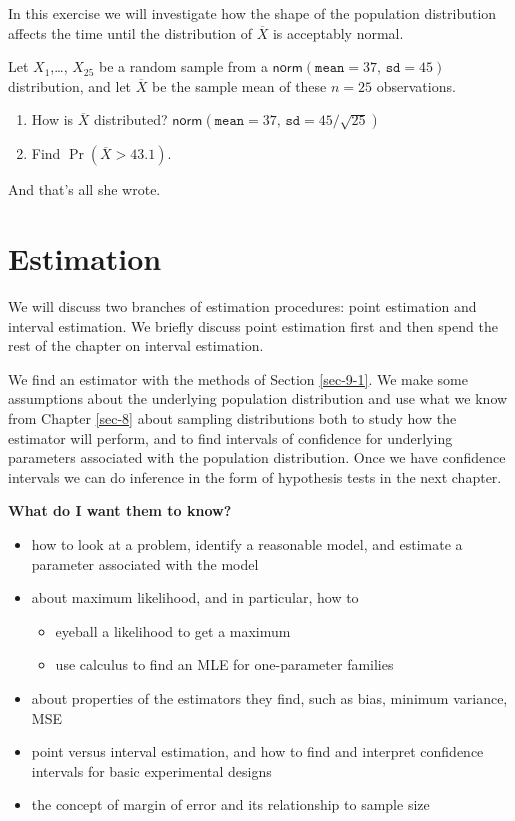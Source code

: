 \documentclass[captions=tableheading]{scrbook}
\begin{document}
\begin{xca}
In this exercise we will investigate how the shape of the population distribution affects the time until the distribution of \(\overline{X}\) is acceptably normal.
\end{xca}

\begin{xca}
Let \(X_{1}\),\ldots{}, \(X_{25}\) be a random sample from a \(\mathsf{norm}(\mathtt{mean}=37,\,\mathtt{sd}=45)\) distribution, and let \(\overline{X}\) be the sample mean of these \(n=25\) observations.
\begin{enumerate}
\item How is \(\overline{X}\) distributed? 
   \(\mathsf{norm}(\mathtt{mean}=37,\,\mathtt{sd}=45/\sqrt{25})\)
\item Find \(\Pr(\overline{X} > 43.1)\).
\end{enumerate}
And that's all she wrote.
\end{xca}
\chapter{Estimation}
\label{sec-9}
\label{cha-Estimation}


\noindent 
We will discuss two branches of estimation procedures: point estimation and interval estimation. We briefly discuss point estimation first and then spend the rest of the chapter on interval estimation.

We find an estimator with the methods of Section \ref{sec-9-1}. We make some assumptions about the underlying population distribution and use what we know from Chapter \ref{sec-8} about sampling distributions both to study how the estimator will perform, and to find intervals of confidence for underlying parameters associated with the population distribution. Once we have confidence intervals we can do inference in the form of hypothesis tests in the next chapter.

\textbf{What do I want them to know?}
\begin{itemize}
\item how to look at a problem, identify a reasonable model, and estimate a parameter associated with the model
\item about maximum likelihood, and in particular, how to
\begin{itemize}
\item eyeball a likelihood to get a maximum
\item use calculus to find an MLE for one-parameter families
\end{itemize}
\item about properties of the estimators they find, such as bias, minimum variance, MSE
\item point versus interval estimation, and how to find and interpret confidence intervals for basic experimental designs
\item the concept of margin of error and its relationship to sample size
\end{itemize}
\end{document}
